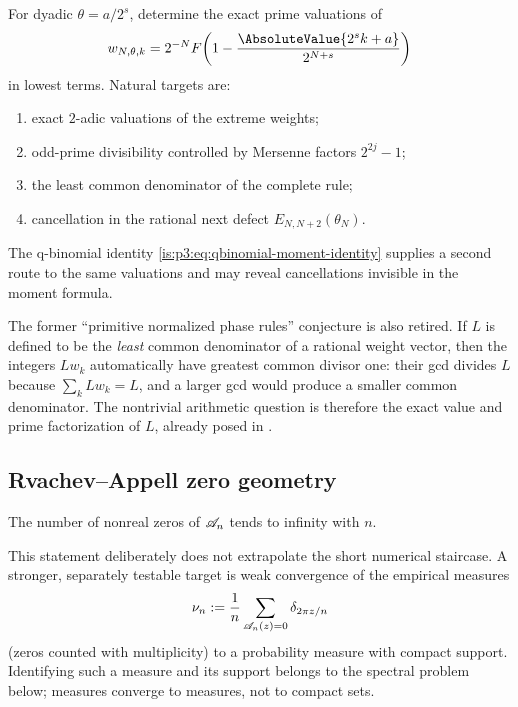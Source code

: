 \begin{problem}
\label{is:p3:prob:weight-valuations}
For dyadic $\theta=a/2^s$, determine the exact prime valuations of
\[
 w_{N,\theta,k}=2^{-N}F\!\left(1-\frac{\AbsoluteValue{2^sk+a}}{2^{N+s}}\right)
\]
in lowest terms.  Natural targets are:
\begin{enumerate}
\item exact $2$-adic valuations of the extreme weights;
\item odd-prime divisibility controlled by Mersenne factors $2^{2j}-1$;
\item the least common denominator of the complete rule;
\item cancellation in the rational next defect $E_{N,N+2}(\theta_N)$.
\end{enumerate}
The q-binomial identity \eqref{is:p3:eq:qbinomial-moment-identity} supplies a second route to the same valuations and may reveal cancellations invisible in the moment formula.
\end{problem}

The former ``primitive normalized phase rules'' conjecture is also retired.
If $L$ is defined to be the \emph{least} common denominator of a rational
weight vector, then the integers $Lw_k$ automatically have greatest common
divisor one: their gcd divides $L$ because $\sum_kLw_k=L$, and a larger gcd
would produce a smaller common denominator.  The nontrivial arithmetic
question is therefore the exact value and prime factorization of $L$, already
posed in .

\subsection{Rvachev--Appell zero geometry}

\begin{conjecture}
\label{is:p3:conj:Appell-root-staircase}
The number of nonreal zeros of $\mathscr A_n$ tends to infinity with $n$.
\end{conjecture}

This statement deliberately does not extrapolate the short numerical
staircase.  A stronger, separately testable target is weak convergence of the
empirical measures
\[
 \nu_n:=\frac1n\sum_{\mathscr A_n(z)=0}\delta_{2\pi z/n}
\]
(zeros counted with multiplicity) to a probability measure with compact
support.  Identifying such a measure and its support belongs to the spectral
problem below; measures converge to measures, not to compact sets.


